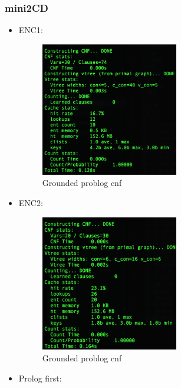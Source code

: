 \documentclass[a4paper,10pt]{report}
\begin{document}
\subsubsection*{mini2CD}

\begin{itemize}
	\item ENC1:
\begin{figure}[H]
  \includegraphics[width=6cm]{minic2d-ENC1.png}
  \caption{Grounded problog cnf}
 
\end{figure}
	\item ENC2:
	\begin{figure}[H]
  \includegraphics[width=6cm]{minic2d-ENC2.png}
  \caption{Grounded problog cnf}
\end{figure}
	\item Prolog first:
\end{itemize}
\end{document}

